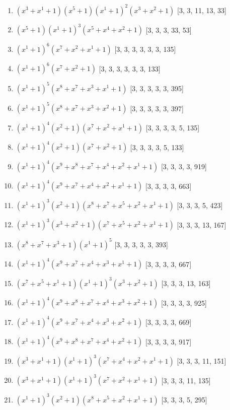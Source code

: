 \documentclass[10pt,twocolumn]{article}
\begin{document}
\begin{enumerate}
\item $(x^{3} + x^{1} + 1)(x^{5} + 1)(x^{1} + 1)^{2}(x^{3} + x^{2} + 1)$  [3, 3, 11, 13, 33]
\item $(x^{5} + 1)(x^{1} + 1)^{3}(x^{5} + x^{4} + x^{2} + 1)$  [3, 3, 3, 33, 53]
\item $(x^{1} + 1)^{6}(x^{7} + x^{2} + x^{1} + 1)$  [3, 3, 3, 3, 3, 3, 135]
\item $(x^{1} + 1)^{6}(x^{7} + x^{2} + 1)$  [3, 3, 3, 3, 3, 3, 133]
\item $(x^{1} + 1)^{5}(x^{8} + x^{7} + x^{3} + x^{1} + 1)$  [3, 3, 3, 3, 3, 395]
\item $(x^{1} + 1)^{5}(x^{8} + x^{7} + x^{3} + x^{2} + 1)$  [3, 3, 3, 3, 3, 397]
\item $(x^{1} + 1)^{4}(x^{2} + 1)(x^{7} + x^{2} + x^{1} + 1)$  [3, 3, 3, 3, 5, 135]
\item $(x^{1} + 1)^{4}(x^{2} + 1)(x^{7} + x^{2} + 1)$  [3, 3, 3, 3, 5, 133]
\item $(x^{1} + 1)^{4}(x^{9} + x^{8} + x^{7} + x^{4} + x^{2} + x^{1} + 1)$  [3, 3, 3, 3, 919]
\item $(x^{1} + 1)^{4}(x^{9} + x^{7} + x^{4} + x^{2} + x^{1} + 1)$  [3, 3, 3, 3, 663]
\item $(x^{1} + 1)^{3}(x^{2} + 1)(x^{8} + x^{7} + x^{5} + x^{2} + x^{1} + 1)$  [3, 3, 3, 5, 423]
\item $(x^{1} + 1)^{3}(x^{3} + x^{2} + 1)(x^{7} + x^{5} + x^{2} + x^{1} + 1)$  [3, 3, 3, 13, 167]
\item $(x^{8} + x^{7} + x^{3} + 1)(x^{1} + 1)^{5}$  [3, 3, 3, 3, 3, 393]
\item $(x^{1} + 1)^{4}(x^{9} + x^{7} + x^{4} + x^{3} + x^{1} + 1)$  [3, 3, 3, 3, 667]
\item $(x^{7} + x^{5} + x^{1} + 1)(x^{1} + 1)^{3}(x^{3} + x^{2} + 1)$  [3, 3, 3, 13, 163]
\item $(x^{1} + 1)^{4}(x^{9} + x^{8} + x^{7} + x^{4} + x^{3} + x^{2} + 1)$  [3, 3, 3, 3, 925]
\item $(x^{1} + 1)^{4}(x^{9} + x^{7} + x^{4} + x^{3} + x^{2} + 1)$  [3, 3, 3, 3, 669]
\item $(x^{1} + 1)^{4}(x^{9} + x^{8} + x^{7} + x^{4} + x^{2} + 1)$  [3, 3, 3, 3, 917]
\item $(x^{3} + x^{1} + 1)(x^{1} + 1)^{3}(x^{7} + x^{4} + x^{2} + x^{1} + 1)$  [3, 3, 3, 11, 151]
\item $(x^{3} + x^{1} + 1)(x^{1} + 1)^{3}(x^{7} + x^{2} + x^{1} + 1)$  [3, 3, 3, 11, 135]
\item $(x^{1} + 1)^{3}(x^{2} + 1)(x^{8} + x^{5} + x^{2} + x^{1} + 1)$  [3, 3, 3, 5, 295]

\end{enumerate}
\end{document}
